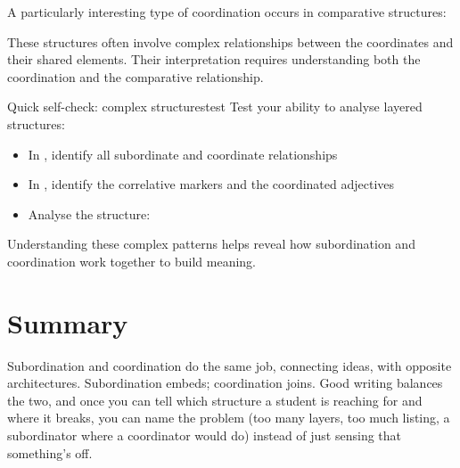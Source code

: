 A particularly interesting type of coordination occurs in comparative structures:

\ea \label{ex:coord-comp}
    \z
\z
These structures often involve complex relationships between the coordinates and their shared elements. Their interpretation requires understanding both the coordination and the comparative relationship.

\begin{tblsframedsymbol}{Quick self-check: complex structures}{test}
Test your ability to analyse layered structures:
\begin{itemize}[noitemsep, leftmargin=*]
    \item In , identify all subordinate and coordinate relationships
    \item In , identify the correlative markers and the coordinated adjectives
    \item Analyse the structure: 
\end{itemize}
Understanding these complex patterns helps reveal how subordination and coordination work together to build meaning.
\end{tblsframedsymbol}


\section{Summary}

Subordination and coordination do the same job, connecting ideas, with opposite architectures. Subordination embeds; coordination joins. Good writing balances the two, and once you can tell which structure a student is reaching for and where it breaks, you can name the problem (too many layers, too much listing, a subordinator where a coordinator would do) instead of just sensing that something's off.
